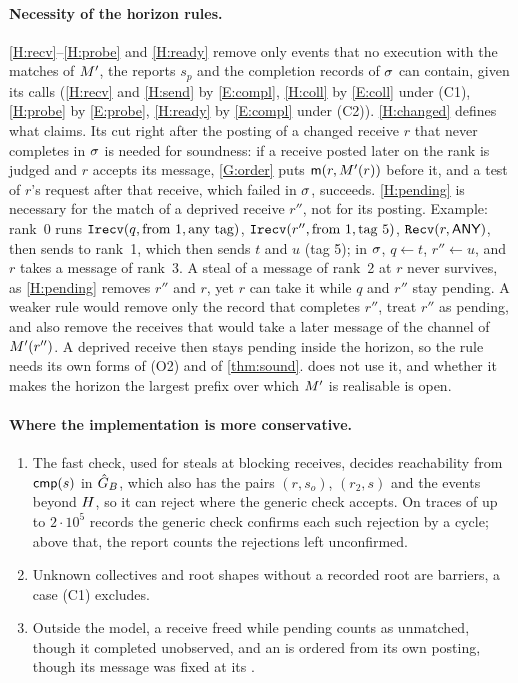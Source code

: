 \paragraph{Necessity of the horizon rules.}
\ref{H:recv}--\ref{H:probe} and \ref{H:ready} remove only events that no execution with the
matches of $M'$, the reports $s_p$ and the completion records of $\sigma$ can contain, given
its calls (\ref{H:recv} and \ref{H:send} by \ref{E:compl}, \ref{H:coll} by \ref{E:coll} under
(C1), \ref{H:probe} by \ref{E:probe}, \ref{H:ready} by \ref{E:compl} under (C2)).
\ref{H:changed} defines what \Lone claims. Its cut right after the posting of a changed receive
$r$ that never completes in $\sigma$ is needed for soundness: if a receive posted later on the
rank is judged and $r$ accepts its message, \ref{G:order} puts $\mathsf{m}(r,M'(r))$ before it,
and a test of $r$'s request after that receive, which failed in $\sigma$, succeeds.
\ref{H:pending} is necessary for the match of a
deprived receive $r''$, not for its posting. Example: rank~0 runs
$\texttt{Irecv}(q,\text{from }1,\text{any tag})$,
$\texttt{Irecv}(r'',\text{from }1,\text{tag }5)$, $\texttt{Recv}(r,\textsf{ANY})$, then sends to
rank~1, which then sends $t$ and $u$ (tag 5); in $\sigma$, $q\gets t$, $r''\gets u$, and $r$
takes a message of rank~3. A steal of a message of rank~2 at $r$ never survives, as
\ref{H:pending} removes $r''$ and $r$, yet $r$ can take it while $q$ and $r''$ stay pending. A
weaker rule would remove only the record that completes $r''$, treat $r''$ as pending, and also
remove the receives that would take a later message of the channel of $M'(r'')$. A deprived
receive then stays pending inside the horizon, so the rule needs its own forms of (O2) and of
\cref{thm:sound}. \tool does not use it, and whether it makes the horizon the largest prefix over
which $M'$ is realisable is open.

\paragraph{Where the implementation is more conservative.}
\begin{enumerate}[leftmargin=*]
\item The fast check, used for steals at blocking receives, decides reachability from
  $\mathsf{cmp}(s)$ in $\hat G_B$, which also has the pairs $(r,s_o)$, $(r_2,s)$ and the events beyond
  $H$, so it can reject where the generic check accepts. On traces of up to $2\cdot10^5$
  records the generic check confirms each such rejection by a cycle; above that, the report
  counts the rejections left unconfirmed.
\item Unknown collectives and root shapes without a recorded root are barriers, a case (C1)
  excludes.
\item Outside the model, a receive freed while pending counts as unmatched, though it completed
  unobserved, and an  is ordered from its own posting, though its message was
  fixed at its .
\end{enumerate}

